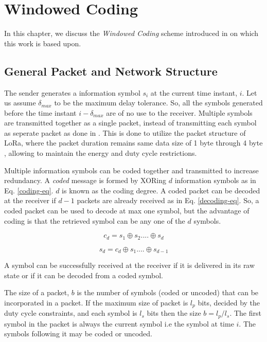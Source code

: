 \chapter{Windowed Coding}
\label{chap-2}
\graphicspath{{Chapter_2/Vector/}{Chapter_2/}}

In this chapter, we discuss the \textit{Windowed Coding} scheme introduced in \cite{borkotokyicc} on which this work is based upon.

\section{General Packet and Network Structure}
The sender generates a information symbol $s_i$ at the current time instant, $i$. Let us assume $\delta_{max}$ to be the maximum delay tolerance. So, all the symbols generated before the time instant $i - \delta_{max}$ are of no use to the receiver. Multiple symbols are transmitted together as a single packet, instead of transmitting each symbol as seperate packet as done in \cite{DRINEA2013100, Fong}. This is done to utilize the packet structure of LoRa, where the packet duration remains same data size of 1 byte through 4 byte \cite{lora}, allowing to maintain the energy and duty cycle restrictions.

Multiple information symbols can be coded together and transmitted to increase redundancy. A \textit{coded} message is formed by XORing $d$ information symbols as in Eq. \ref{coding-eq}. $d$ is known as the coding degree. A coded packet can be decoded at the receiver if $d-1$ packets are already received as in Eq. \ref{decoding-eq}. So, a coded packet can be used to decode at max one symbol, but the advantage of coding is that the retrieved symbol can be any one of the $d$ symbols. 

\begin{equation}
c_d = s_1 \oplus s_2 .... \oplus s_d
\label{coding-eq}
\end{equation}

\begin{equation}
	s_d = c_d \oplus s_1 .... \oplus s_{d-1}
	\label{decoding-eq}
\end{equation}

A symbol can be successfully received at the receiver if it is delivered in its raw state or if it can be decoded from a coded symbol.

The size of a packet, $b$ is the number of symbols (coded or uncoded) that can be incorporated in a packet. If the maximum size of packet is $l_p$ bits, decided by the duty cycle constraints, and each symbol is $l_s$ bits then the size $b = l_p/l_s$. The first symbol in the packet is always the current symbol i.e the symbol at time $i$. The symbols following it may be coded or uncoded.
\\

